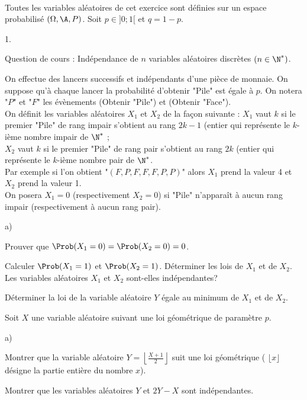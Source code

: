 \documentclass[11pt]{article}%
\begin{document}
\begin{exerciceAP}~\\
  Toutes les variables aléatoires de cet exercice sont définies sur un
  espace probabilisé $(\Omega , \A , P)$. Soit $p \in ]0 ; 1[$ et $q =
  1-p$.
  \begin{noliste}{1.}
    \setlength{\itemsep}{2mm}
  \item Question de cours : Indépendance de $n$ variables aléatoires
    discrètes $(n \in \N^*)$.
  \item On effectue des lancers successifs et indépendants d'une pièce
    de monnaie. On suppose qu'à chaque lancer la probabilité d'obtenir
    "Pile" est égale à $p$. On notera "$P$" et "$F$" les évènements
    (Obtenir "Pile") et (Obtenir "Face"). \\
    On définit les variables aléatoires $X_1$ et $X_2$ de la façon
    suivante : $X_1$ vaut $k$ si le premier "Pile" de rang impair
    s'obtient au rang $2k-1$ (entier qui représente le $k$-ième nombre
    impair de $\N^*$ ; \\ 
    $X_2$ vaut $k$ si le premier "Pile" de rang pair s'obtient au rang
    $2k$ (entier qui représente le $k$-ième nombre pair de $\N^*$. \\ 
    Par exemple si l'on obtient "$(F , P , F , F , F , P , P)$" alors
    $X_1$ prend la valeur 4 et $X_2$ prend la valeur 1. \\ 
    On posera $X_1 = 0$ (respectivement $X_2=0$) si "Pile" n'apparaît
    à aucun rang impair (respectivement à aucun rang pair).
    \begin{noliste}{a)}
    \setlength{\itemsep}{2mm} 
    \item Prouver que $\Prob(X_1 = 0) = \Prob(X_2 = 0) = 0$.
    \item Calculer $\Prob(X_1 = 1)$ et $\Prob(X_2 = 1)$. Déterminer
      les lois de $X_1$ et de $X_2$. Les variables aléatoires $X_1$ et
      $X_2$ sont-elles indépendantes?
    \item Déterminer la loi de la variable aléatoire $Y$ égale au
      minimum de $X_1$ et de $X_2$.
    \end{noliste}
  \item Soit $X$ une variable aléatoire suivant une loi géométrique de
    paramètre $p$. \begin{noliste}{a)}
    \setlength{\itemsep}{2mm}
    \item Montrer que la variable aléatoire $Y = \left\lfloor
        \frac{X+1}{2} \right\rfloor$ suit une loi géométrique (
      $\lfloor x \rfloor$ désigne la partie entière du nombre $x$).
    \item Montrer que les variables aléatoires $Y$ et $2Y - X$ sont
      indépendantes.
    \end{noliste}
  \end{noliste}
\end{exerciceAP}
\end{document}
